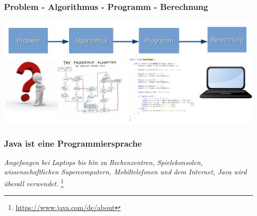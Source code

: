 \documentclass{beamer}
\begin{document}
	\begin{frame}
		\frametitle{Problem - Algorithmus - Programm - Berechnung}
		\includegraphics[width=\textwidth]{Alg-Prog-Schema}
	\end{frame}

	\begin{frame}
		\frametitle{Java ist eine Programmiersprache}
		\textit{\glqq Angefangen bei Laptops bis hin zu Rechenzentren, Spielekonsolen, wissenschaftlichen Supercomputern, Mobiltelefonen und dem Internet, Java wird überall verwendet.\grqq} \footnote{\url{https://www.java.com/de/about}}\\
		\pause
		\vspace{10pt}
		\begin{minipage}{.15\textwidth}

\end{minipage}
\end{frame}
\end{document}
